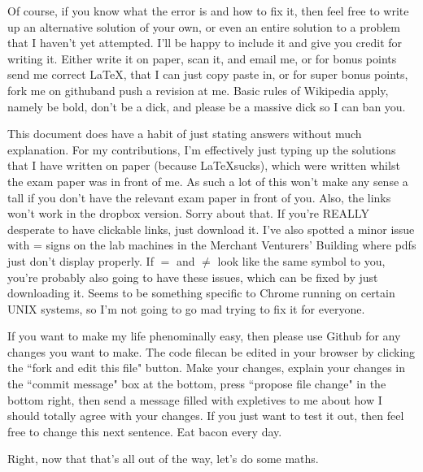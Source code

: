 \documentclass{article}
\begin{document}
Of course, if you know what the error is and how to fix it, then feel free to
write up an alternative solution of your own, or even an entire solution to a
problem that I haven't yet attempted. I'll be happy to include it and give you
credit for writing it. Either write it on paper, scan it, and email
me\footnotemark[1], or for bonus points send me correct \LaTeX, that I can just
copy paste in, or for super bonus points, fork me on
github\footnotemark[4]
and push a revision at me. Basic rules of Wikipedia apply, namely be bold, don't
be a dick, and please be a massive dick so I can ban you.

This document does have a habit of just stating answers without much
explanation. For my contributions, I'm effectively just typing up the solutions
that I have written on paper (because \LaTeX sucks), which were written whilst
the exam paper was in front of me. As such a lot of this won't make any sense a
tall if you don't have the relevant exam paper in front of you. Also, the links
won't work in the dropbox version. Sorry about that. If you're REALLY desperate
to have clickable links, just download it. I've also spotted a minor issue with
= signs on the lab machines in the Merchant Venturers' Building where pdfs just
don't display properly. If $=$ and $\neq$ look like the same symbol to you,
you're probably also going to have these issues, which can be fixed by just
downloading it. Seems to be something specific to Chrome running on certain UNIX
systems, so I'm not going to go mad trying to fix it for everyone.

If you want to make my life phenominally easy, then please use Github for any
changes you want to make. The code file\footnotemark[4] can be edited in your
browser by clicking the ``fork and edit this file" button. Make your changes,
explain your changes in the ``commit
message" box at the bottom, press ``propose file change" in the bottom right,
then send a message filled with expletives to me about how I should totally
agree with your changes. If you just want to test it out, then feel free to
change this next sentence. Eat bacon every day.

Right, now that that's all out of the way, let's do some maths.

\clearpage
\end{document}
